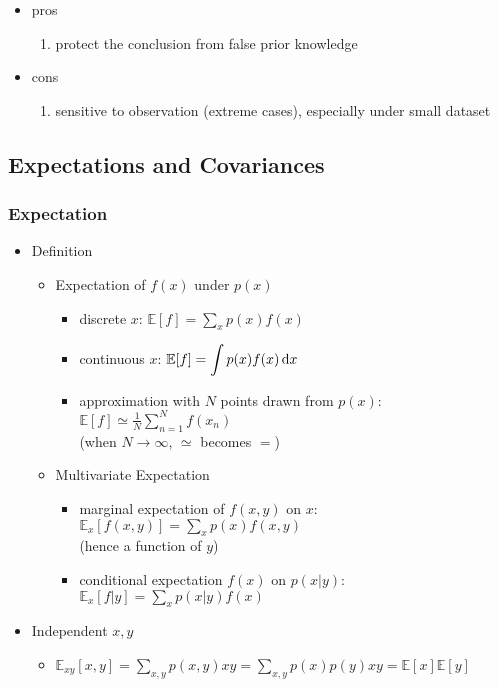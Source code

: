 \begin{itemize}
\begin{itemize}
\begin{itemize}
\begin{enumerate}
 			\end{enumerate}
 		\item pros
 			\begin{enumerate}
 			\item protect the conclusion from false prior knowledge
 			\end{enumerate}
 		\item cons
 			\begin{enumerate}
 			\item sensitive to observation (extreme cases), especially under small dataset
			\end{enumerate}
		\end{itemize}
	\end{itemize}
\end{itemize}

\subsection{Expectations and Covariances}

\subsubsection{Expectation}
\begin{itemize}
\item Definition
	\begin{itemize}
	\item Expectation of $f(x)$ under $p(x)$
		\begin{itemize}
		\item discrete $x$: $\displaystyle \mathbb{E}[f] = \sum_xp(x)f(x)$
		\item continuous $x$: $\displaystyle \mathbb{E}[f] = \int p(x)f(x)\mathop{}\!\mathrm{d} x$
		\item approximation with $N$ points drawn from $p(x)$: $\displaystyle \mathbb E[f] \simeq \frac 1N \sum_{n=1}^N f(x_n)$ \\
		(when $N\rightarrow \infty$, $\simeq$ becomes $=$)
		\end{itemize}
	\item Multivariate Expectation
		\begin{itemize}
		\item marginal expectation of $f(x,y)$ on $x$: $\displaystyle \mathbb{E}_x[f(x,y)] = \sum_xp(x)f(x,y)$ \\
		(hence a function of $y$)
		\item conditional expectation $f(x)$ on $p(x|y)$: $\displaystyle \mathbb{E}_x[f|y] = \sum_x p(x|y)f(x)$
		\end{itemize}
	\end{itemize}
	\item Independent $x,y$
		\begin{itemize}
		\item $\displaystyle \mathbb{E}_{xy}[x,y] = \sum_{x,y}p(x,y)xy = \sum_{x,y}p(x)p(y)xy = \mathbb{E}[x]\mathbb{E}[y]$
		\end{itemize}
\end{itemize}

